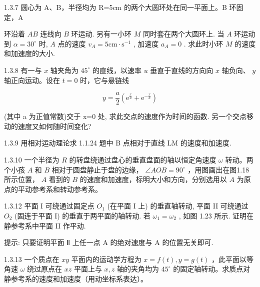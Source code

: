 \begin{problem}{1.3.7}
圆心为 A、B，半径均为 R=5cm 的两个大圆环处在同一平面上。B 环固定，A

环沿着 $AB$ 连线向 $B$ 环运动. 另有一小环 $M$ 同时套在两个大圆环上. 当 $A$ 环运动到 $\alpha = 30^{\circ}$ 时, $A$ 点的速度 $v_{A} = 5\mathrm{cm}\cdot \mathrm{s}^{-1}$ , 加速度 $a_{A} = 0$ . 求此时小环 $M$ 的速度和加速度的大小.
\end{problem}
\clearpage


\begin{problem}{1.3.8}
有一与 $x$ 轴夹角为 $45^{\circ}$ 的直线，以速率 $u$ 垂直于直线的方向向 $x$ 轴负向、 $y$ 轴正向运动。设在 $t = 0$ 时，它与悬链线

\[
y = \frac {a}{2} \left(\mathrm{e} ^ {\frac {x}{a}} + \mathrm{e} ^ {- \frac {x}{a}}\right)
\]

(其中 a 为正值常数)交于 x=0 处, 求此交点的速度作为时间的函数. 另一个交点移动的速度又如何随时间变化?
\end{problem}
\clearpage


\begin{problem}{1.3.9}
用相对运动理论求 1.1.24 题中 B 点相对于直线 LM 的速度和加速度.
\end{problem}
\clearpage


\begin{problem}{1.3.10}
一个半径为 $R$ 的转盘绕通过盘心的垂直盘面的轴以恒定角速度 $\omega$ 转动。两个小孩 $A$ 和 $B$ 相对于圆盘静止于盘的边缘， $\angle AOB = 90^{\circ}$ ，用图画出在图1.18所示位置， $A$ 看到的 $B$ 的速度和加速度，标明大小和方向，分别选用以 $A$ 为原点的平动参考系和转动参考系。
\begin{center}

\end{center}
\end{problem}
\clearpage


\begin{problem}{1.3.12}
平面 I 可绕通过固定点 $O_{1}$ (在平面 I 上) 的垂直轴转动, 平面 II 可绕通过 $O_{2}$ (固连于平面 I) 的垂直于两平面的轴转动. 若 $\omega_{1} = \omega_{2}$ , 如图 1.23 所示. 证明在静参考系中平面 II 作平动.

提示: 只要证明平面 Ⅱ 上任一点 A 的绝对速度与 A 的位置无关即可.
\begin{center}

\end{center}
\end{problem}
\clearpage


\begin{problem}{1.3.13}
一个质点在 $xy$ 平面内的运动学方程为 $x = f(t), y = g(t)$ ，此平面以等角速 $\omega$ 绕过原点在 $xz$ 平面上与 $x, z$ 轴的夹角均为 $45^{\circ}$ 的固定轴转动。求质点对静参考系的速度和加速度（用动坐标系表达）。
\end{problem}
\clearpage


